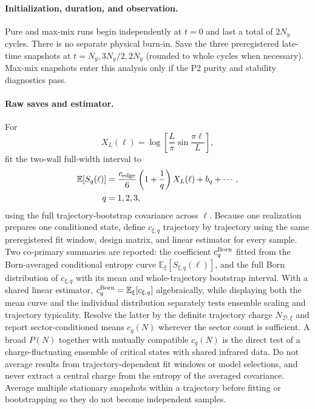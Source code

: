 \documentclass[aps,prx,twocolumn,floatfix,nofootinbib,superscriptaddress,longbibliography]{revtex4-2}
\newcommand{\E}{\mathbb{E}}
\begin{document}
\paragraph*{Initialization, duration, and observation.}
Pure and max-mix runs begin independently at $t=0$ and last a total of $2N_y$ cycles.
There is no separate physical burn-in.  Save the three preregistered late-time snapshots
at $t=N_y,3N_y/2,2N_y$ (rounded to whole cycles when necessary).  Max-mix snapshots enter
this analysis only if the P2 purity and stability diagnostics pass.

\paragraph*{Raw saves and estimator.}
For
\begin{equation}
 X_L(\ell)=\log\!\left[\frac{L}{\pi}\sin\frac{\pi\ell}{L}\right],
\end{equation}
fit the two-wall full-width interval to
\begin{equation}
 \begin{aligned}
 \E[S_q(\ell)]&=\frac{c_{\rm edge}}{6}\left(1+\frac1q\right)X_L(\ell)
 +b_q+\cdots,\\
 q&=1,2,3,
 \end{aligned}
 \label{eq:renyi}
\end{equation}
using the full trajectory-bootstrap covariance across $\ell$.  Because one realization
prepares one conditioned state, define $c_{\xi,q}$ trajectory by trajectory using the same
preregistered fit window, design matrix, and linear estimator for every sample.  Two
co-primary summaries are reported: the coefficient $c_q^{\rm Born}$ fitted from the
Born-averaged conditional entropy curve $\E_\xi[S_{\xi,q}(\ell)]$, and the full Born
distribution of $c_{\xi,q}$ with its mean and whole-trajectory bootstrap interval.  With a
shared linear estimator, $c_q^{\rm Born}=\E_\xi[c_{\xi,q}]$ algebraically, while displaying
both the mean curve and the individual distribution separately tests ensemble scaling and
trajectory typicality.  Resolve the latter by the definite trajectory charge
$N_{\mathcal D,\xi}$ and report sector-conditioned means $c_q(N)$ wherever the sector count
is sufficient.  A broad $P(N)$ together with mutually compatible $c_q(N)$ is the direct
test of a charge-fluctuating ensemble of critical states with shared infrared data.  Do not
average results from trajectory-dependent fit windows or model selections, and never
extract a central charge from the entropy of the averaged covariance.  Average multiple
stationary snapshots within a trajectory before fitting or bootstrapping so they do not
become independent samples.
\end{document}
